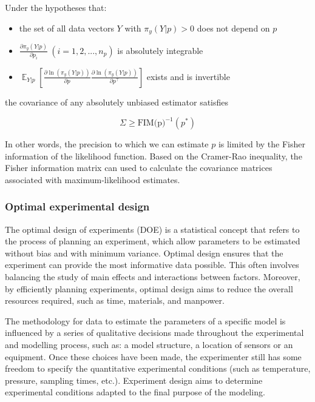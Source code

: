 \documentclass[../Article_Design_of_Experiment.tex]{subfiles}
\begin{document}
	Under the hypotheses that:
	
	\begin{itemize}
		\item the set of all data vectors $Y$ with $\pi_y(Y|p) > 0$ does not depend on $p$
		\item $\frac{\partial \pi_y(Y|p)}{\partial p_i}~\left(i=1,2,...,n_p\right)$ is absolutely integrable
		\item $\mathop{\mathbb{E}}_{Y|p} \left[ \frac{\partial \ln (\pi_y (Y|p))}{\partial p} \frac{\partial \ln (\pi_y (Y|p))}{\partial p^\top} \right]$ exists and is invertible
	\end{itemize}
	
	the covariance of any absolutely unbiased estimator satisfies
	
	{\footnotesize
	\begin{equation}
		\Sigma \geq \text{FIM(p)}^{-1}(p^*)
	\end{equation} }
	
	In other words, the precision to which we can estimate $p$ is limited by the Fisher information of the likelihood function. Based on the Cramer-Rao inequality, the Fisher information matrix can used to calculate the covariance matrices associated with maximum-likelihood estimates.
	
	\subsubsection{Optimal experimental design}
	
	The optimal design of experiments (DOE) is a statistical concept that refers to the process of planning an experiment, which allow parameters to be estimated without bias and with minimum variance. Optimal design ensures that the experiment can provide the most informative data possible. This often involves balancing the study of main effects and interactions between factors. Moreover, by efficiently planning experiments, optimal design aims to reduce the overall resources required, such as time, materials, and manpower.
	
	The methodology for data to estimate the parameters of a specific model is influenced by a series of qualitative decisions made throughout the experimental and modelling process, such as: a model structure, a location of sensors or an equipment. Once these choices have been made, the experimenter still has some freedom to specify the quantitative experimental conditions (such as temperature, pressure, sampling times, etc.). Experiment design aims to determine experimental conditions adapted to the final purpose of the modeling. 
	
\end{document}

